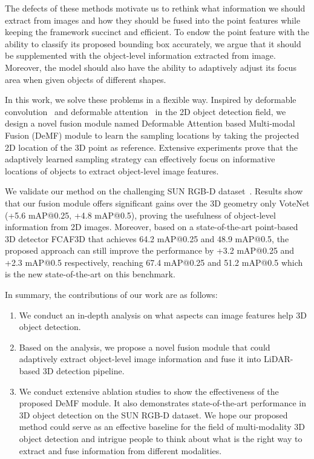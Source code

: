 \documentclass[runningheads]{llncs}
\begin{document}
The defects of these methods motivate us to rethink what information we should extract from images and how they should be fused into the point features while keeping the framework succinct and efficient. To endow the point feature with the ability to classify its proposed bounding box accurately, we argue that it should be supplemented with the object-level information extracted from image. Moreover, the model should also have the ability to adaptively adjust its focus area when 
given objects of different shapes.

In this work, we solve these problems in a flexible way. Inspired by deformable convolution~\cite{dai17deform,zhu19deformv2} and deformable attention~\cite{zhu2020deformable} in the 2D object detection field, we design a novel fusion module named Deformable Attention based Multi-modal Fusion (DeMF) module to learn the sampling locations by taking the projected 2D location of the 3D point as reference. 
Extensive experiments prove that
the adaptively learned sampling strategy can effectively focus on informative locations of objects to extract object-level image features.

We validate our method on the challenging SUN RGB-D dataset~\cite{sunrgbd}. Results show that our fusion module offers significant gains over the 3D geometry only VoteNet (+5.6 mAP@0.25, +4.8
mAP@0.5), proving the usefulness of object-level information from 2D images. Moreover, based on a state-of-the-art point-based 3D detector FCAF3D that achieves 64.2 mAP@0.25 and 48.9 mAP@0.5, the proposed approach can still improve the performance by +3.2 mAP@0.25 and +2.3 mAP@0.5 respectively, reaching 67.4 mAP@0.25 and 51.2 mAP@0.5 which is the new state-of-the-art on this benchmark.

In summary, the contributions of our work are as follows:
\begin{enumerate}
    \item We conduct an in-depth analysis on what aspects can image features help 3D object detection.
    \item Based on the analysis, we propose a novel fusion module that could adaptively extract object-level image information and fuse it into LiDAR-based 3D detection pipeline.
    \item We conduct extensive ablation studies to show the effectiveness of the proposed DeMF module. It also demonstrates state-of-the-art performance in 3D object detection on the SUN RGB-D dataset. We hope our proposed method could serve as an effective baseline for the field of multi-modality 3D object detection and intrigue people to think about what is the right way to extract and fuse information from different modalities.
\end{enumerate}
\end{document}
